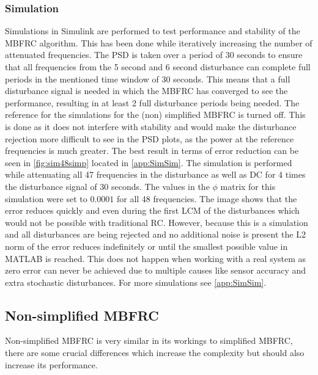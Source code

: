 \documentclass[journal]{IEEEtran}
\begin{document}
\subsubsection{Simulation}\label{sssec: SimplifiedMBFRC_Simulation}
Simulations in Simulink \cite{Simulink_website} are performed to test performance and stability of the MBFRC algorithm. This has been done while iteratively increasing the number of attenuated frequencies. The PSD is taken over a period of 30 seconds to ensure that all frequencies from the 5 second and 6 second disturbance can complete full periods in the mentioned time window of 30 seconds. This means that a full disturbance signal is needed in which the MBFRC has converged to see the performance, resulting in at least 2 full disturbance periods being needed. The reference for the simulations for the (non) simplified MBFRC is turned off. This is done as it does not interfere with stability and would make the disturbance rejection more difficult to see in the PSD plots, as the power at the reference frequencies is much greater. The best result in terms of error reduction can be seen in \autoref{fig:sim48simp} located in \autoref{app:SimSim}. The simulation is performed while attenuating all 47 frequencies in the disturbance as well as DC for 4 times the disturbance signal of 30 seconds. The values in the $\phi$ matrix for this simulation were set to $0.0001$ for all 48 frequencies. The image shows that the error reduces quickly and even during the first LCM of the disturbances which would not be possible with traditional RC. However, because this is a simulation and all disturbances are being rejected and no additional noise is present the L2 norm of the error reduces indefinitely or until the smallest possible value in  MATLAB is reached. This does not happen when working with a real system as zero error can never be achieved due to multiple causes like sensor accuracy and extra stochastic disturbances. For more simulations see \autoref{app:SimSim}.


\subsection{Non-simplified MBFRC}\label{ssec: NonSimplifiedMBFRC}
Non-simplified MBFRC is very similar in its workings to simplified MBFRC, there are some crucial differences which increase the complexity but should also increase its performance.
\end{document}
